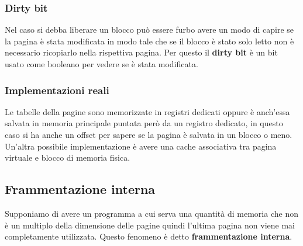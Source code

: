 \documentclass{article}
\begin{document}
\subsubsection{Dirty bit}
Nel caso si debba liberare un blocco può essere furbo avere un modo di capire se la pagina è stata modificata in modo tale che se il blocco è stato solo letto non è necessario ricopiarlo nella rispettiva pagina. Per questo il \textbf{dirty bit} è un bit usato come booleano per vedere se è stata modificata.

\subsubsection{Implementazioni reali}
Le tabelle della pagine sono memorizzate in registri dedicati oppure è anch'essa salvata in memoria principale puntata però da un registro dedicato, in questo caso si ha anche un offset per sapere se la pagina è salvata in un blocco o meno.
Un'altra possibile implementazione è avere una cache associativa tra pagina virtuale e blocco di memoria fisica.

\subsection{Frammentazione interna} Supponiamo di avere un programma a cui serva una quantità di memoria che non è un multiplo della dimensione delle pagine quindi l'ultima pagina non viene mai completamente utilizzata. Questo fenomeno è detto \textbf{frammentazione interna}.
\end{document}
